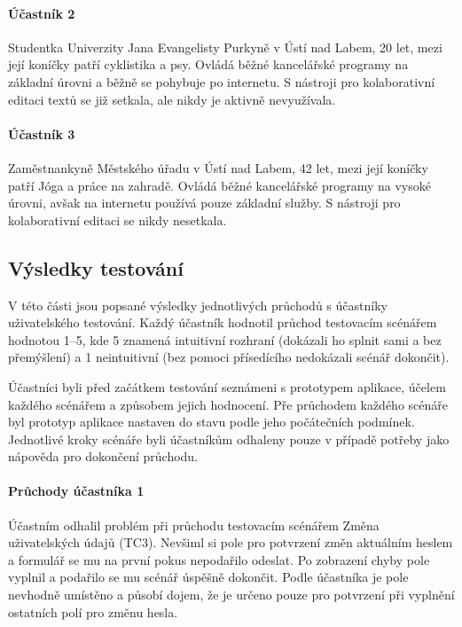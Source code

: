\paragraph{Účastník 2}
Studentka Univerzity Jana Evangelisty Purkyně v Ústí nad Labem, 20 let, mezi její koníčky patří cyklistika a psy.
Ovládá běžné kancelářské programy na základní úrovni a běžně se pohybuje po internetu.
S nástroji pro kolaborativní editaci textů se již setkala, ale nikdy je aktivně nevyužívala.

\paragraph{Účastník 3}
Zaměstnankyně Městského úřadu v Ústí nad Labem, 42 let, mezi její koníčky patří Jóga a práce na zahradě.
Ovládá běžné kancelářské programy na vysoké úrovni, avšak na internetu používá pouze základní služby.
S nástroji pro kolaborativní editaci se nikdy nesetkala.

\subsection{Výsledky testování}

V této části jsou popsané výsledky jednotlivých průchodů s účastníky uživatelského testování.
Každý účastník hodnotil průchod testovacím scénářem hodnotou 1--5, kde 5 znamená intuitivní rozhraní (dokázali ho splnit sami a bez přemýšlení) a 1 neintuitivní (bez pomoci přísedícího nedokázali scénář dokončit).

Účastníci byli před začátkem testování seznámeni s prototypem aplikace, účelem každého scénářem a způsobem jejich hodnocení.
Pře průchodem každého scénáře byl prototyp aplikace nastaven do stavu podle jeho počátečních podmínek.
Jednotlivé kroky scénáře byli účastníkům odhaleny pouze v případě potřeby jako nápověda pro dokončení průchodu.

\paragraph{Průchody účastníka 1}

Účastním odhalil problém při průchodu testovacím scénářem Změna uživatelských údajů (TC3).
Nevšiml si pole pro potvrzení změn aktuálním heslem a formulář se mu na první pokus nepodařilo odeslat.
Po zobrazení chyby pole vyplnil a podařilo se mu scénář úspěšně dokončit.
Podle účastníka je pole nevhodně umístěno a působí dojem, že je určeno pouze pro potvrzení při vyplnění ostatních polí pro změnu hesla.

